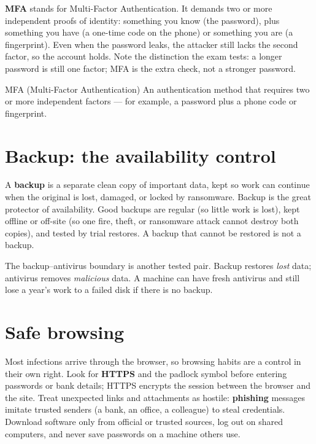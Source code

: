 \textbf{MFA} stands for Multi-Factor Authentication. It demands two or more
independent proofs of identity: something you know (the password), plus
something you have (a one-time code on the phone) or something you are (a
fingerprint). Even when the password leaks, the attacker still lacks the
second factor, so the account holds. Note the distinction the exam tests: a
longer password is still one factor; MFA is the extra check, not a stronger
password.

\begin{definitionbox}{MFA (Multi-Factor Authentication)}
An authentication method that requires two or more independent factors ---
for example, a password plus a phone code or fingerprint.
\end{definitionbox}

\section{Backup: the availability control}
A \textbf{backup} is a separate clean copy of important data, kept so work
can continue when the original is lost, damaged, or locked by ransomware.
Backup is the great protector of availability. Good backups are regular (so
little work is lost), kept offline or off-site (so one fire, theft, or
ransomware attack cannot destroy both copies), and tested by trial restores. A
backup that cannot be restored is not a backup.

The backup--antivirus boundary is another tested pair. Backup restores
\emph{lost} data; antivirus removes \emph{malicious} data. A machine can have
fresh antivirus and still lose a year's work to a failed disk if there is no
backup.

\section{Safe browsing}
Most infections arrive through the browser, so browsing habits are a control
in their own right. Look for \textbf{HTTPS} and the padlock symbol before
entering passwords or bank details; HTTPS encrypts the session between the
browser and the site. Treat unexpected links and attachments as hostile:
\textbf{phishing} messages imitate trusted senders (a bank, an office, a
colleague) to steal credentials. Download software only from official or
trusted sources, log out on shared computers, and never save passwords on a
machine others use.

